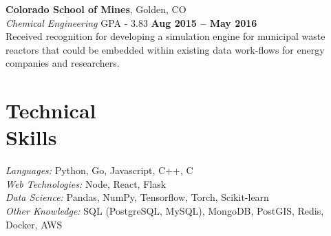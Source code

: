 \documentclass[margin,line]{resume}
\begin{document}
\begin{resume}
    \textbf{Colorado School of Mines}, Golden, CO \vspace{2mm}\\\vspace{1mm}%
    \textsl{Chemical Engineering} GPA - 3.83 \hfill \textbf{Aug 2015 -- May 2016}\\
    Received recognition for developing a simulation engine for municipal waste
    reactors that could be embedded within existing data work-flows for energy
    companies and researchers.

    \section{\mysidestyle Technical\\Skills}

    \emph{Languages:} Python, Go, Javascript, C++, C\\
    \emph{Web Technologies:} Node, React, Flask\\
    \emph{Data Science:} Pandas, NumPy, Tensorflow, Torch, Scikit-learn\\
    \emph{Other Knowledge:} SQL (PostgreSQL, MySQL), MongoDB, PostGIS, Redis, Docker, AWS\\
\end{resume}
\end{document}
